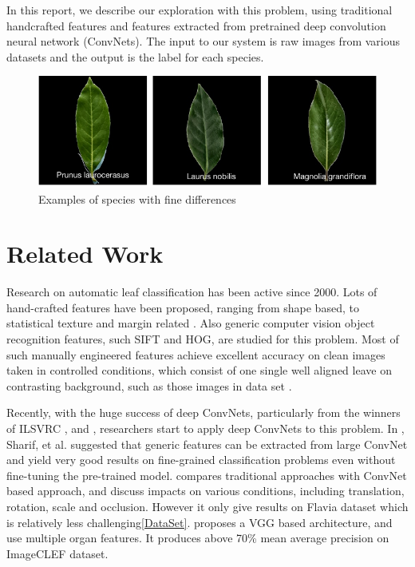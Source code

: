 \documentclass[journal, 10pt]{IEEEtran}
\begin{document}
In this report, we describe our exploration with this problem, using traditional handcrafted features and features extracted from pretrained deep convolution neural network (ConvNets). The input to our system is raw images from various datasets and the output is the label for each species.

\begin{figure}[H]
  \centering
  \includegraphics[width=0.8\linewidth]{easilyconfused}
  \caption{Examples of species with fine differences}
\end{figure}


\section{Related Work}
Research on automatic leaf classification has been active since 2000. Lots of hand-crafted features have been proposed, ranging from shape based, to statistical texture and margin related \cite{Charles13} \cite{Pedro13} \cite{Cho2002}. Also generic computer vision object recognition features, such SIFT\cite{SIFT} and HOG\cite{HOG}, are studied for this problem.  Most of such manually engineered features achieve excellent accuracy on clean images taken in controlled conditions, which consist of one single well aligned leave on contrasting background, such as those images in data set \cite{SwedishLeafDataset}.

Recently, with the huge success of deep ConvNets, particularly from the winners of ILSVRC \cite{Alex2014} \cite{VGGNetReference}, \cite{GoogleNetReference} and \cite{ResNet}, researchers start to apply deep ConvNets to this problem.  In \cite{CNNOfTheShelf}, Sharif, et al. suggested that generic features can be extracted from large ConvNet and yield very good results on fine-grained classification problems even without fine-tuning the pre-trained model. \cite{EvaluationOfLeafConv} compares traditional approaches with ConvNet based approach, and discuss impacts on various conditions, including translation, rotation, scale and occlusion. However it only give results on Flavia\cite{FlaviaDataset} dataset which is relatively less challenging\ref{DataSet}. \cite{PlantIdentificationConv} proposes a VGG\cite{VGGNetReference} based architecture, and use multiple organ features. It produces above 70\% mean average precision on ImageCLEF dataset\cite{ImageCLEF2013}.
\end{document}
